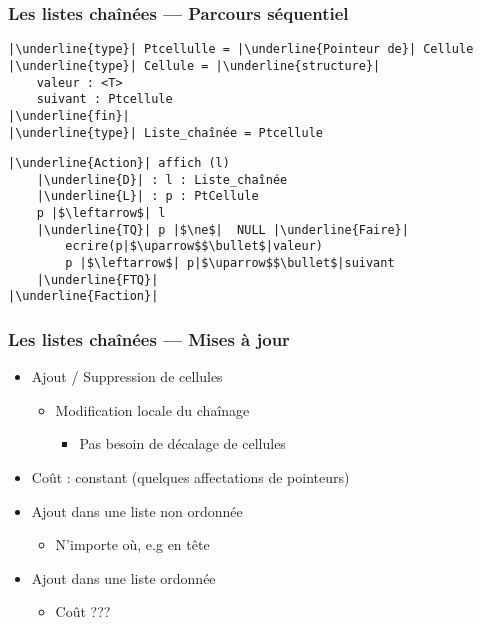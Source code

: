 \documentclass[table,handout,tikz,12pt,svgnames]{beamer}
\begin{document}
\begin{frame}[fragile=singleslide]
	\frametitle{Les listes chaînées --- Parcours séquentiel}
	\vspace{-0.7cm}
	\begin{block}{} %
		\begin{verbatim}
|\underline{type}| Ptcellulle = |\underline{Pointeur de}| Cellule
|\underline{type}| Cellule = |\underline{structure}|
	valeur : <T>
	suivant : Ptcellule
|\underline{fin}|
|\underline{type}| Liste_chaînée = Ptcellule
		\end{verbatim}
		\begin{verbatim}
|\underline{Action}| affich (l)
	|\underline{D}| : l : Liste_chaînée 
	|\underline{L}| : p : PtCellule
	p |$\leftarrow$| l
	|\underline{TQ}| p |$\ne$|  NULL |\underline{Faire}| 
		ecrire(p|$\uparrow$$\bullet$|valeur)
		p |$\leftarrow$| p|$\uparrow$$\bullet$|suivant
	|\underline{FTQ}|
|\underline{Faction}|
		\end{verbatim}
	\end{block}
\end{frame}


\begin{frame}[fragile=singleslide]
	\frametitle{Les listes chaînées --- Mises à jour}
	\vspace{-2cm}
	\begin{itemize}
		\item Ajout / Suppression de cellules
		\begin{itemize}
			\item Modification locale du chaînage
			\begin{itemize}
				\item Pas besoin de décalage de cellules
			\end{itemize}
		\end{itemize}
		\item Coût : constant \small(quelques affectations de pointeurs)
		\item Ajout dans une liste non ordonnée
		\begin{itemize}
			\item N'importe où, e.g en tête
		\end{itemize}
		\item Ajout dans une liste ordonnée
		\begin{itemize}
			\item Coût ???
		\end{itemize}
		
	\end{itemize}
\end{frame}
\end{document}

